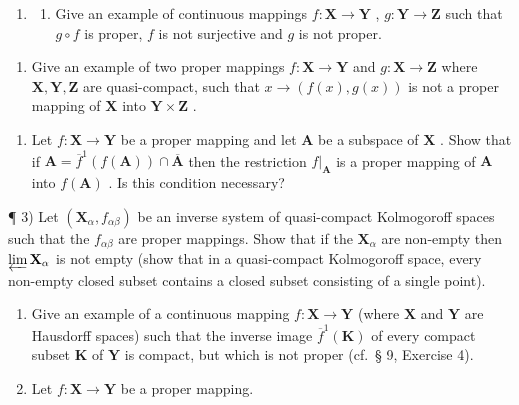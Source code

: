 \BourbakiExerciseGroup

\begin{enumerate}
\def\labelenumi{\arabic{enumi})}
\tightlist
\item
  \begin{enumerate}
  \def\labelenumii{\alph{enumii})}
  \tightlist
  \item
    Give an example of continuous mappings \(f: \mathbf{X} \to \mathbf{Y}\) , \(g: \mathbf{Y} \to \mathbf{Z}\) such that \(g \circ f\) is proper, \(f\) is not surjective and \(g\) is not proper.
  \end{enumerate}
\end{enumerate}

\begin{enumerate}
\def\labelenumi{\alph{enumi})}
\setcounter{enumi}{1}
\tightlist
\item
  Give an example of two proper mappings \(f: \mathbf{X} \to \mathbf{Y}\) and \(g: \mathbf{X} \to \mathbf{Z}\) where \(\mathbf{X}, \mathbf{Y}, \mathbf{Z}\) are quasi-compact, such that \(x \to (f(x), g(x))\) is not a proper mapping of \(\mathbf{X}\) into \(\mathbf{Y} \times \mathbf{Z}\) .
\end{enumerate}

\begin{enumerate}
\def\labelenumi{\arabic{enumi})}
\setcounter{enumi}{1}
\tightlist
\item
  Let \(f: \mathbf{X} \to \mathbf{Y}\) be a proper mapping and let \(\mathbf{A}\) be a subspace of \(\mathbf{X}\) . Show that if \(\mathbf{A} = \overline{f}^1(f(\mathbf{A})) \cap \overline{\mathbf{A}}\) then the restriction \(f|_{\mathbf{A}}\) is a proper mapping of \(\mathbf{A}\) into \(f(\mathbf{A})\) . Is this condition necessary?
\end{enumerate}

¶ 3) Let \((\mathbf{X}_{\alpha}, f_{\alpha\beta})\) be an inverse system of quasi-compact Kolmogoroff spaces such that the \(f_{\alpha\beta}\) are proper mappings. Show that if the \(\mathbf{X}_{\alpha}\) are non-empty then \(\varprojlim \mathbf{X}_{\alpha}\) is not empty (show that in a quasi-compact Kolmogoroff space, every non-empty closed subset contains a closed subset consisting of a single point).

\begin{enumerate}
\def\labelenumi{\arabic{enumi})}
\setcounter{enumi}{3}
\item
  Give an example of a continuous mapping \(f: \mathbf{X} \to \mathbf{Y}\) (where \(\mathbf{X}\) and \(\mathbf{Y}\) are Hausdorff spaces) such that the inverse image \(\overline{f}^1(\mathbf{K})\) of every compact subset \(\mathbf{K}\) of \(\mathbf{Y}\) is compact, but which is not proper (cf.~§ 9, Exercise 4).
\item
  Let \(f: \mathbf{X} \to \mathbf{Y}\) be a proper mapping.
\end{enumerate}

